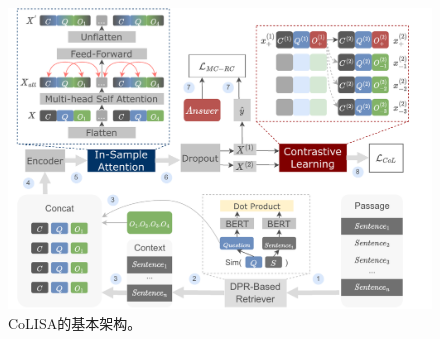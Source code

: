 \begin{figure}[htbp]
    \centering
    \includegraphics [width=1.0\textwidth] {figure/4-1.pdf}
    \caption{CoLISA的基本架构。} %
    \label{fig:4-1}
\end{figure}
